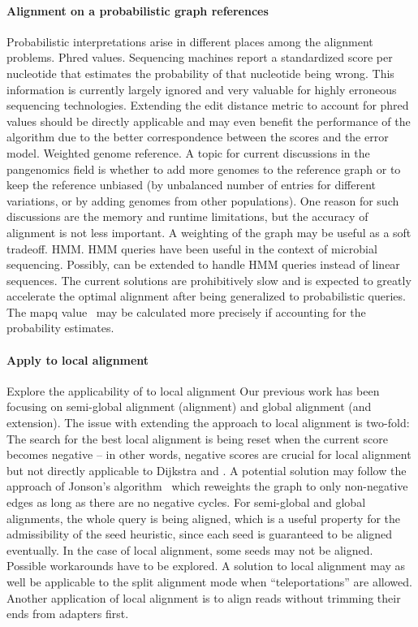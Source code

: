 \paragraph{Alignment on a probabilistic graph references}
Probabilistic interpretations arise in different places among the alignment
problems. Phred values. Sequencing machines report a standardized score per
nucleotide that estimates the probability of that nucleotide being wrong. This
information is currently largely ignored and very valuable for highly erroneous
sequencing technologies. Extending the edit distance metric to account for phred
values should be directly applicable and may even benefit the performance of the
\A algorithm due to the better correspondence between the scores and the error
model. Weighted genome reference. A topic for current discussions in the
pangenomics field is whether to add more genomes to the reference graph or to
keep the reference unbiased (by unbalanced number of entries for different
variations, or by adding genomes from other populations). One reason for such
discussions are the memory and runtime limitations, but the accuracy of
alignment is not less important. A weighting of the graph may be useful as a
soft tradeoff. HMM. HMM queries have been useful in the context of microbial
sequencing. Possibly, \A can be extended to handle HMM queries instead of linear
sequences. The current solutions are prohibitively slow and \astarix is expected
to greatly accelerate the optimal alignment after being generalized to
probabilistic queries. The mapq value~\citep{li2008mapping} may be calculated
more precisely if accounting for the probability estimates.

\paragraph{Apply \A to local alignment}
Explore the applicability of \A to local alignment Our previous work has been
focusing on semi-global alignment (alignment) and global alignment (and
extension). The issue with extending the \A approach to local alignment is
two-fold: The search for the best local alignment is being reset when the
current score becomes negative – in other words, negative scores are crucial for
local alignment but not directly applicable to Dijkstra and \A. A potential
solution may follow the approach of Jonson's
algorithm~\citep{johnson1977efficient} which reweights the graph to only
non-negative edges as long as there are no negative cycles. For semi-global and
global alignments, the whole query is being aligned, which is a useful property
for the admissibility of the seed heuristic, since each seed is guaranteed to be
aligned eventually. In the case of local alignment, some seeds may not be
aligned. Possible workarounds have to be explored. A solution to local alignment
may as well be applicable to the split alignment mode when ``teleportations''
are allowed. Another application of local alignment is to align reads without
trimming their ends from adapters first.

